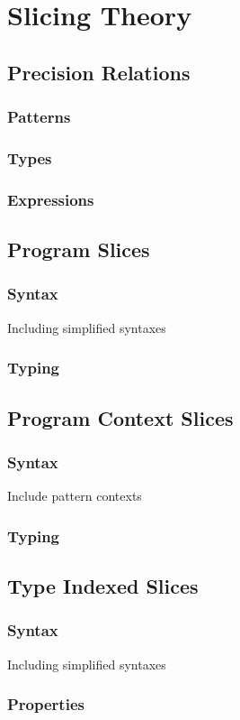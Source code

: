 \chapter{Slicing Theory}
\section{Precision Relations}
\subsection{Patterns}
\subsection{Types}
\subsection{Expressions}

\section{Program Slices}
\subsection{Syntax}
Including simplified syntaxes
\subsection{Typing}

\section{Program Context Slices}
\subsection{Syntax}
Include pattern contexts
\subsection{Typing}

\section{Type Indexed Slices}
\subsection{Syntax}
Including simplified syntaxes
\subsection{Properties}

